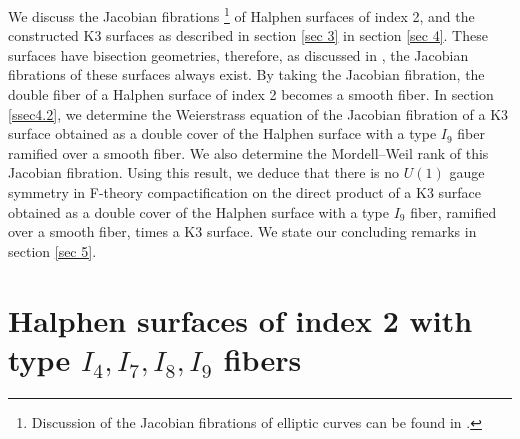 \documentclass[12pt]{article}
\begin{document}
\par We discuss the Jacobian fibrations \footnote{Discussion of the Jacobian fibrations of elliptic curves can be found in \cite{Cas}.} of Halphen surfaces of index 2, and the constructed K3 surfaces as described in section \ref{sec 3} in section \ref{sec 4}. These surfaces have bisection geometries, therefore, as discussed in \cite{BM}, the Jacobian fibrations of these surfaces always exist. By taking the Jacobian fibration, the double fiber of a Halphen surface of index 2 becomes a smooth fiber. In section \ref{ssec4.2}, we determine the Weierstrass equation of the Jacobian fibration of a K3 surface obtained as a double cover of the Halphen surface with a type $I_9$ fiber ramified over a smooth fiber. We also determine the Mordell--Weil rank of this Jacobian fibration. Using this result, we deduce that there is no $U(1)$ gauge symmetry in F-theory compactification on the direct product of a K3 surface obtained as a double cover of the Halphen surface with a type $I_9$ fiber, ramified over a smooth fiber, times a K3 surface. We state our concluding remarks in section \ref{sec 5}. 

\section{Halphen surfaces of index 2 with type $I_4, I_7, I_8, I_9$ fibers}
\label{sec 2}
\end{document}
